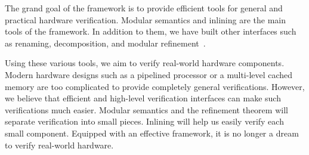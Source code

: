 The grand goal of the \Kami{} framework is to provide efficient tools
for general and practical hardware verification. Modular semantics and
inlining are the main tools of the framework. In addition to them, we
have built other interfaces such as renaming, decomposition, and
modular refinement~\cite{murali-thesis}.

Using these various tools, we aim to verify real-world hardware
components. Modern hardware designs such as a pipelined processor or a
multi-level cached memory are too complicated to provide completely
general verifications. However, we believe that efficient and
high-level verification interfaces can make such verifications much
easier. Modular semantics and the refinement theorem will separate
verification into small pieces. Inlining will help us easily verify
each small component. Equipped with an effective framework, it is no
longer a dream to verify real-world hardware.

